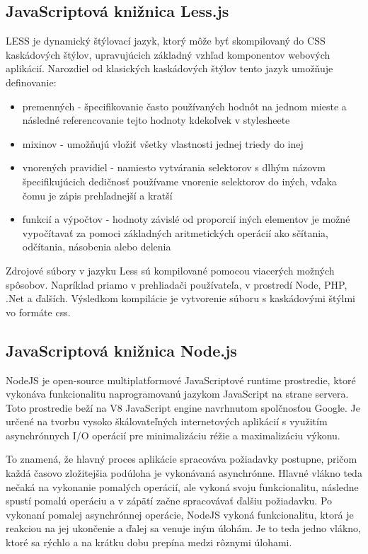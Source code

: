 \subsection{JavaScriptová knižnica Less.js}
LESS je dynamický štýlovací jazyk, ktorý môže byť skompilovaný do CSS kaskádových štýlov, upravujúcich základný vzhľad komponentov webových aplikácií. Narozdiel od klasických kaskádových štýlov tento jazyk umožňuje definovanie: 
\begin{itemize}
	\item premenných - špecifikovanie často používaných hodnôt na jednom mieste a následné referencovanie tejto hodnoty kdekoľvek v stylesheete
	\item mixinov - umožňujú vložiť všetky vlastnosti jednej triedy do inej
	\item vnorených pravidiel - namiesto vytvárania selektorov s dlhým názovm špecifikujúcich dedičnosť používame vnorenie selektorov do iných, vďaka čomu je zápis prehľadnejší a kratší
	\item funkcií a výpočtov - hodnoty závislé od proporcií iných elementov je možné vypočítavať za pomoci základných aritmetických operácií ako sčítania, odčítania, násobenia alebo delenia
\end{itemize}
Zdrojové súbory v jazyku Less sú kompilované pomocou viacerých možných spôsobov. Napríklad priamo v prehliadači používateľa, v prostredí Node, PHP, .Net a ďalších. Výsledkom kompilácie je vytvorenie súboru s kaskádovými štýlmi vo formáte css.

\subsection{JavaScriptová knižnica Node.js}
NodeJS je open-source multiplatformové JavaScriptové runtime prostredie, ktoré vykonáva funkcionalitu naprogramovanú jazykom JavaScript na strane servera. Toto prostredie beží na V8 JavaScript engine navrhnutom spolčnosťou Google. Je určené na tvorbu vysoko škálovateľných internetových aplikácií s využitím asynchrónnych I/O operácií \cite{doi:10.1109/MIC.2010.145} pre minimalizáciu réžie a maximalizáciu výkonu. 

To znamená, že hlavný proces aplikácie spracováva požiadavky postupne, pričom každá časovo zložitejšia podúloha je vykonávaná asynchrónne. Hlavné vlákno teda nečaká na vykonanie pomalých operácií, ale vykoná svoju funkcionalitu, následne spustí pomalú operáciu a v zápätí začne spracovávať ďalšiu požiadavku. Po vykonaní pomalej asynchrónnej operácie, NodeJS vykoná funkcionalitu, ktorá je reakciou na jej ukončenie a ďalej sa venuje iným úlohám. Je to teda jedno vlákno, ktoré sa rýchlo a na krátku dobu prepína medzi rôznymi úlohami. 

